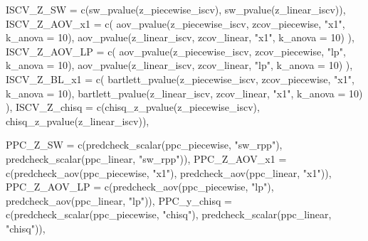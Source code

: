 \documentclass[
  english,
  letterpaper,
  DIV=11,
  numbers=noendperiod]{scrartcl}
\newenvironment{Shaded}{\begin{snugshade}}{\end{snugshade}}
\newcommand{\AttributeTok}[1]{\textcolor[rgb]{0.40,0.45,0.13}{#1}}
\newcommand{\DecValTok}[1]{\textcolor[rgb]{0.68,0.00,0.00}{#1}}
\newcommand{\FunctionTok}[1]{\textcolor[rgb]{0.28,0.35,0.67}{#1}}
\newcommand{\NormalTok}[1]{\textcolor[rgb]{0.00,0.23,0.31}{#1}}
\newcommand{\StringTok}[1]{\textcolor[rgb]{0.13,0.47,0.30}{#1}}
\begin{document}
\begin{Shaded}
\begin{Highlighting}[]
  \AttributeTok{ISCV\_Z\_SW =} \FunctionTok{c}\NormalTok{(}\FunctionTok{sw\_pvalue}\NormalTok{(z\_piecewise\_iscv), }\FunctionTok{sw\_pvalue}\NormalTok{(z\_linear\_iscv)),}
  \AttributeTok{ISCV\_Z\_AOV\_x1 =} \FunctionTok{c}\NormalTok{(}
    \FunctionTok{aov\_pvalue}\NormalTok{(z\_piecewise\_iscv, zcov\_piecewise, }\StringTok{"x1"}\NormalTok{, }\AttributeTok{k\_anova =} \DecValTok{10}\NormalTok{),}
    \FunctionTok{aov\_pvalue}\NormalTok{(z\_linear\_iscv,    zcov\_linear,    }\StringTok{"x1"}\NormalTok{, }\AttributeTok{k\_anova =} \DecValTok{10}\NormalTok{)}
\NormalTok{  ),}
  \AttributeTok{ISCV\_Z\_AOV\_LP =} \FunctionTok{c}\NormalTok{(}
    \FunctionTok{aov\_pvalue}\NormalTok{(z\_piecewise\_iscv, zcov\_piecewise, }\StringTok{"lp"}\NormalTok{, }\AttributeTok{k\_anova =} \DecValTok{10}\NormalTok{),}
    \FunctionTok{aov\_pvalue}\NormalTok{(z\_linear\_iscv,    zcov\_linear,    }\StringTok{"lp"}\NormalTok{, }\AttributeTok{k\_anova =} \DecValTok{10}\NormalTok{)}
\NormalTok{  ),}
  \AttributeTok{ISCV\_Z\_BL\_x1 =} \FunctionTok{c}\NormalTok{(}
    \FunctionTok{bartlett\_pvalue}\NormalTok{(z\_piecewise\_iscv, zcov\_piecewise, }\StringTok{"x1"}\NormalTok{, }\AttributeTok{k\_anova =} \DecValTok{10}\NormalTok{),}
    \FunctionTok{bartlett\_pvalue}\NormalTok{(z\_linear\_iscv,    zcov\_linear,    }\StringTok{"x1"}\NormalTok{, }\AttributeTok{k\_anova =} \DecValTok{10}\NormalTok{)}
\NormalTok{  ),}
  \AttributeTok{ISCV\_Z\_chisq =} \FunctionTok{c}\NormalTok{(}\FunctionTok{chisq\_z\_pvalue}\NormalTok{(z\_piecewise\_iscv), }\FunctionTok{chisq\_z\_pvalue}\NormalTok{(z\_linear\_iscv)),}

  \AttributeTok{PPC\_Z\_SW =} \FunctionTok{c}\NormalTok{(}\FunctionTok{predcheck\_scalar}\NormalTok{(ppc\_piecewise, }\StringTok{"sw\_rpp"}\NormalTok{), }\FunctionTok{predcheck\_scalar}\NormalTok{(ppc\_linear, }\StringTok{"sw\_rpp"}\NormalTok{)),}
  \AttributeTok{PPC\_Z\_AOV\_x1 =} \FunctionTok{c}\NormalTok{(}\FunctionTok{predcheck\_aov}\NormalTok{(ppc\_piecewise, }\StringTok{"x1"}\NormalTok{), }\FunctionTok{predcheck\_aov}\NormalTok{(ppc\_linear, }\StringTok{"x1"}\NormalTok{)),}
  \AttributeTok{PPC\_Z\_AOV\_LP =} \FunctionTok{c}\NormalTok{(}\FunctionTok{predcheck\_aov}\NormalTok{(ppc\_piecewise, }\StringTok{"lp"}\NormalTok{), }\FunctionTok{predcheck\_aov}\NormalTok{(ppc\_linear, }\StringTok{"lp"}\NormalTok{)),}
  \AttributeTok{PPC\_y\_chisq =} \FunctionTok{c}\NormalTok{(}\FunctionTok{predcheck\_scalar}\NormalTok{(ppc\_piecewise, }\StringTok{"chisq"}\NormalTok{), }\FunctionTok{predcheck\_scalar}\NormalTok{(ppc\_linear, }\StringTok{"chisq"}\NormalTok{)),}


\end{Highlighting}
\end{Shaded}
\end{document}

